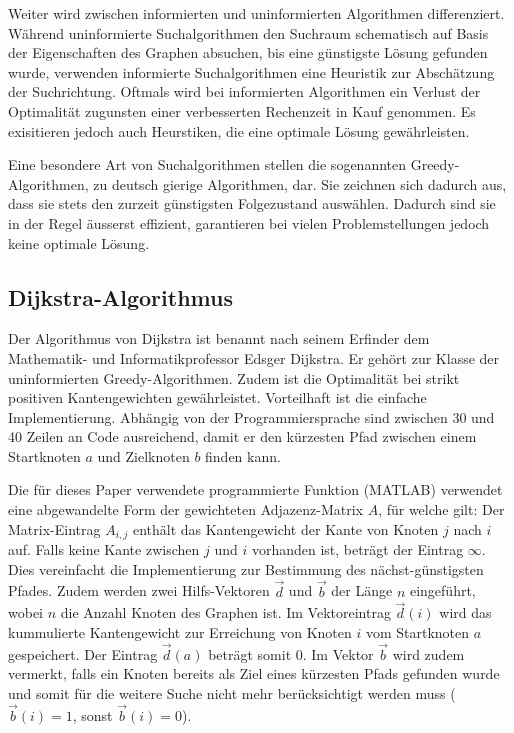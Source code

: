 Weiter wird zwischen informierten und uninformierten Algorithmen differenziert. Während uninformierte Suchalgorithmen den Suchraum schematisch auf Basis der Eigenschaften des Graphen absuchen, bis eine günstigste Lösung gefunden wurde, verwenden informierte Suchalgorithmen eine Heuristik zur Abschätzung der Suchrichtung. Oftmals wird bei informierten Algorithmen ein Verlust der Optimalität zugunsten einer verbesserten Rechenzeit in Kauf genommen. Es exisitieren jedoch auch Heurstiken, die eine optimale Lösung gewährleisten.
%
%
%

%
%
%
Eine besondere Art von Suchalgorithmen stellen die sogenannten Greedy-Algorithmen, zu deutsch gierige Algorithmen, dar. Sie zeichnen sich dadurch aus, dass sie stets den zurzeit günstigsten Folgezustand auswählen. Dadurch sind sie in der Regel äusserst effizient, garantieren bei vielen Problemstellungen jedoch keine optimale Lösung.

\subsection{Dijkstra-Algorithmus}
Der Algorithmus von Dijkstra ist benannt nach seinem Erfinder dem Mathematik- und Informatikprofessor Edsger Dijkstra. Er gehört zur Klasse der uninformierten Greedy-Algorithmen. Zudem ist die Optimalität bei strikt positiven Kantengewichten gewährleistet.
%
%
Vorteilhaft ist die einfache Implementierung. Abhängig von der Programmiersprache sind zwischen 30 und 40 Zeilen an Code ausreichend, damit er den kürzesten Pfad zwischen einem Startknoten $a$ und Zielknoten $b$ finden kann. 

Die für dieses Paper verwendete programmierte Funktion (MATLAB) verwendet eine abgewandelte Form der gewichteten Adjazenz-Matrix $A$, für welche gilt:
%
%
Der Matrix-Eintrag $A_{i,j}$ enthält das Kantengewicht der Kante von Knoten $j$ nach $i$ auf. Falls keine Kante zwischen $j$ und $i$ vorhanden ist, beträgt der Eintrag $\infty$. Dies vereinfacht die Implementierung zur Bestimmung des nächst-günstigsten Pfades.
Zudem werden zwei Hilfs-Vektoren $\vec{d}$ und $\vec{b}$ der Länge $n$ eingeführt, wobei $n$ die Anzahl Knoten des Graphen ist. Im Vektoreintrag $\vec{d}(i)$ wird das kummulierte Kantengewicht zur Erreichung von Knoten $i$ vom Startknoten $a$ gespeichert. Der Eintrag $\vec{d}(a)$ beträgt somit $0$. Im Vektor $\vec{b}$ wird zudem vermerkt, falls ein Knoten bereits als Ziel eines kürzesten Pfads gefunden wurde und somit für die weitere Suche nicht mehr berücksichtigt werden muss ($\vec{b}(i)=1$, sonst $\vec{b}(i)=0$).

